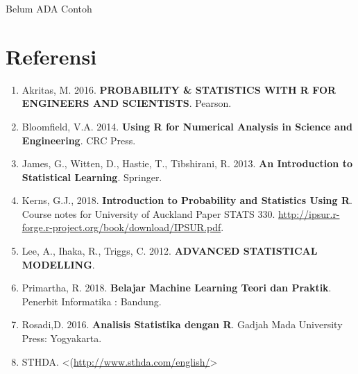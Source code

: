 \documentclass[
]{book}
\providecommand{\tightlist}{%
  \setlength{\itemsep}{0pt}\setlength{\parskip}{0pt}}
\theoremstyle{definition}
\theoremstyle{definition}
\theoremstyle{definition}
\theoremstyle{definition}
\theoremstyle{remark}
\begin{document}
Belum ADA Contoh

\hypertarget{referensi-7}{%
\section{Referensi}\label{referensi-7}}

\begin{enumerate}
\def\labelenumi{\arabic{enumi}.}
\tightlist
\item
  Akritas, M. 2016. \textbf{PROBABILITY \& STATISTICS WITH R FOR ENGINEERS AND SCIENTISTS}. Pearson.
\item
  Bloomfield, V.A. 2014. \textbf{Using R for Numerical Analysis in Science and Engineering}. CRC Press.
\item
  James, G., Witten, D., Hastie, T., Tibshirani, R. 2013. \textbf{An Introduction to Statistical Learning}. Springer.
\item
  Kerns, G.J., 2018. \textbf{Introduction to Probability and Statistics Using R}. Course notes for University of Auckland Paper STATS 330. \url{http://ipsur.r-forge.r-project.org/book/download/IPSUR.pdf}.
\item
  Lee, A., Ihaka, R., Triggs, C. 2012. \textbf{ADVANCED STATISTICAL MODELLING}.
\item
  Primartha, R. 2018. \textbf{Belajar Machine Learning Teori dan Praktik}. Penerbit Informatika : Bandung.
\item
  Rosadi,D. 2016. \textbf{Analisis Statistika dengan R}. Gadjah Mada University Press: Yogyakarta.
\item
  STHDA. \textless(\url{http://www.sthda.com/english/}\textgreater{}
\end{enumerate}

  
\end{document}
